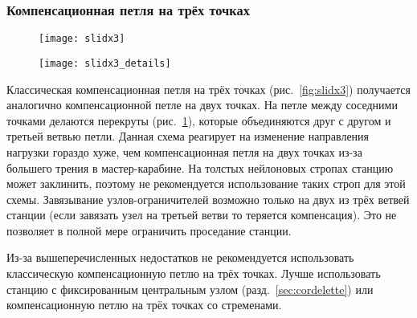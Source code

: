 \documentclass[fleqn, 12pt]{extarticle}
\begin{document}
    \subsubsection{Компенсационная петля на трёх точках}
    \begin{figure}[h]
        \centering
        \begin{minipage}[t]{0.45\textwidth}
            \texttt{[image: slidx3]}
            \label{fig:slidx3}
        \end{minipage}\hspace{0.05\textwidth}
        \begin{minipage}[t]{0.45\textwidth}
            \texttt{[image: slidx3\_details]}
            \label{fig:slidx3_details}
        \end{minipage} 
    \end{figure}
    Классическая компенсационная петля на трёх точках (рис.~\ref{fig:slidx3}) получается аналогично компенсационной петле на двух точках.
    На петле между соседними точками делаются перекруты (рис.~\ref{fig:slidx3_details}),
    которые объединяются друг с другом и третьей ветвью петли. Данная схема реагирует на изменение направления нагрузки гораздо хуже, чем компенсационная петля на двух точках
    из-за большего трения в мастер-карабине. На толстых нейлоновых стропах станцию может заклинить, поэтому не рекомендуется использование таких строп для этой схемы.
    Завязывание узлов-ограничителей возможно только на двух из трёх ветвей станции (если завязать узел на третьей ветви то теряется компенсация). Это не позволяет в полной мере
    ограничить проседание станции.
    
    Из-за вышеперечисленных недостатков не рекомендуется использовать классическую компенсационную петлю на трёх точках. Лучше использовать станцию с фиксированным центральным узлом
    (разд.~\ref{sec:cordelette}) или компенсационную петлю на трёх точках со стременами.
    
\end{document}
